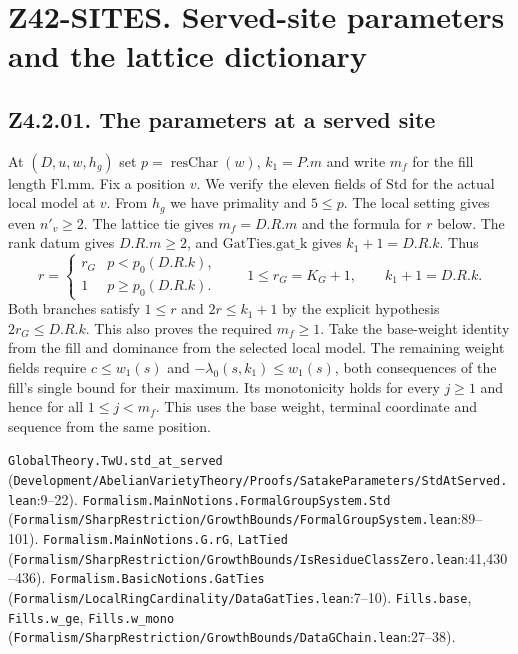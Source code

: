 \section*{Z42-SITES. Served-site parameters and the lattice dictionary}

\subsection{Z4.2.01. The parameters at a served site}\label{r5:Z4.2.01}
At $(D,u,w,h_g)$ set $p=\operatorname{resChar}(w)$, $k_1=P.m$ and write $m_f$ for the fill length $\mathrm{Fl.mm}$. Fix a position $v$. We verify the eleven fields of $\mathrm{Std}$ for the actual local model at $v$.
From $h_g$ we have primality and $5\le p$. The local setting gives even $n'_v\ge2$. The lattice tie gives $m_f=D.R.m$ and the formula for $r$ below. The rank datum gives $D.R.m\ge2$, and $\mathrm{GatTies}.\mathrm{gat\_k}$ gives $k_1+1=D.R.k$. Thus
\[
 r=\begin{cases}r_G& p<p_0(D.R.k),\\1& p\ge p_0(D.R.k).\end{cases}
 \qquad 1\le r_G=K_G+1,\qquad k_1+1=D.R.k.
\]
Both branches satisfy $1\le r$ and $2r\le k_1+1$ by the explicit hypothesis $2r_G\le D.R.k$. This also proves the required $m_f\ge1$. Take the base-weight identity from the fill and dominance from the selected local model. The remaining weight fields require $c\le w_1(s)$ and $-\lambda_0(s,k_1)\le w_1(s)$, both consequences of the fill's single bound for their maximum. Its monotonicity holds for every $j\ge1$ and hence for all $1\le j<m_f$. This uses the base weight, terminal coordinate and sequence from the same position.

{\footnotesize \nolinkurl{GlobalTheory.TwU.std_at_served} (\nolinkurl{Development/AbelianVarietyTheory/Proofs/SatakeParameters/StdAtServed.lean}\allowbreak:9--22). \nolinkurl{Formalism.MainNotions.FormalGroupSystem.Std} (\nolinkurl{Formalism/SharpRestriction/GrowthBounds/FormalGroupSystem.lean}\allowbreak:89--101). \nolinkurl{Formalism.MainNotions.G.rG}, \nolinkurl{LatTied} (\nolinkurl{Formalism/SharpRestriction/GrowthBounds/IsResidueClassZero.lean}\allowbreak:41,430--436). \nolinkurl{Formalism.BasicNotions.GatTies} (\nolinkurl{Formalism/LocalRingCardinality/DataGatTies.lean}\allowbreak:7--10). \nolinkurl{Fills.base}, \nolinkurl{Fills.w_ge}, \nolinkurl{Fills.w_mono} (\nolinkurl{Formalism/SharpRestriction/GrowthBounds/DataGChain.lean}\allowbreak:27--38).}

